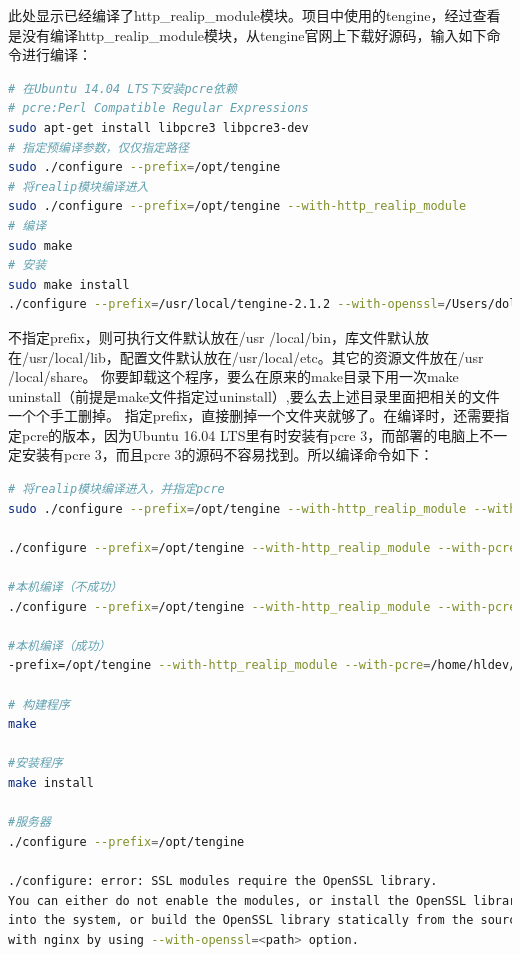 \documentclass[letter]{book}
\begin{document}
此处显示已经编译了http\_realip\_module模块。项目中使用的tengine，经过查看是没有编译http\_realip\_module模块，从tengine官网上下载好源码，输入如下命令进行编译：

\begin{lstlisting}[language=bash]
# 在Ubuntu 14.04 LTS下安装pcre依赖
# pcre:Perl Compatible Regular Expressions
sudo apt-get install libpcre3 libpcre3-dev
# 指定预编译参数，仅仅指定路径
sudo ./configure --prefix=/opt/tengine
# 将realip模块编译进入
sudo ./configure --prefix=/opt/tengine --with-http_realip_module
# 编译
sudo make
# 安装
sudo make install
./configure --prefix=/usr/local/tengine-2.1.2 --with-openssl=/Users/dolphin/source/openssl
\end{lstlisting}

不指定prefix，则可执行文件默认放在/usr /local/bin，库文件默认放在/usr/local/lib，配置文件默认放在/usr/local/etc。其它的资源文件放在/usr /local/share。
你要卸载这个程序，要么在原来的make目录下用一次make uninstall（前提是make文件指定过uninstall）,要么去上述目录里面把相关的文件一个个手工删掉。
指定prefix，直接删掉一个文件夹就够了。在编译时，还需要指定pcre的版本，因为Ubuntu 16.04 LTS里有时安装有pcre 3，而部署的电脑上不一定安装有pcre 3，而且pcre 3的源码不容易找到。所以编译命令如下：

\begin{lstlisting}[language=bash]
# 将realip模块编译进入，并指定pcre
sudo ./configure --prefix=/opt/tengine --with-http_realip_module --with-pcre=/root/software/pcre-8.40 --with-openssl=/root/software/openssl-OpenSSL_1_1_0e --without-http_gzip_module

./configure --prefix=/opt/tengine --with-http_realip_module --with-pcre=/root/software/pcre-8.40  --without-http_gzip_module

#本机编译（不成功）
./configure --prefix=/opt/tengine --with-http_realip_module --with-pcre=/home/hldev/Downloads/pcre-8.40 --with-openssl=/home/hldev/Downloads/openssl-OpenSSL_1_0_1e --without-http_gzip_module

#本机编译（成功）
-prefix=/opt/tengine --with-http_realip_module --with-pcre=/home/hldev/Downloads/pcre-8.40 --with-openssl=/home/hldev/software/openssl-OpenSSL_1_0_2g --without-http_gzip_module

# 构建程序
make

#安装程序
make install

#服务器
./configure --prefix=/opt/tengine

./configure: error: SSL modules require the OpenSSL library.
You can either do not enable the modules, or install the OpenSSL library
into the system, or build the OpenSSL library statically from the source
with nginx by using --with-openssl=<path> option.


\end{lstlisting}
\end{document}
